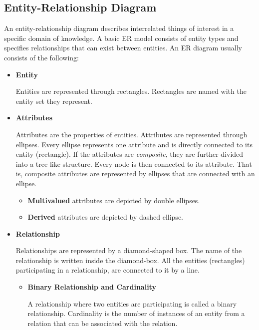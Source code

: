 	\subsection{Entity-Relationship Diagram}	
	\vs
	An entity-relationship diagram describes interrelated things of interest in a specific domain of knowledge. A basic ER model consists of entity types and specifies relationships that can exist between entities.
	\vs
	An ER diagram usually consists of the following:
	\begin{itemize}
	\item 
	\textbf{\large Entity}
	
	Entities are represented through rectangles. Rectangles are named with the entity set they represent. 
	\item 
	\textbf{\large Attributes}
	
	Attributes are the properties of entities. Attributes are represented through ellipses. Every ellipse represents one attribute and is directly connected to its entity (rectangle). If the attributes are {\em composite}, they are further divided into a tree-like structure. Every node is then connected to its attribute. That is, composite attributes are represented by ellipses that are connected with an ellipse. 
	\begin{itemize}
		\item \textbf{Multivalued} attributes are depicted by double ellipses.
		\item \textbf{Derived} attributes are depicted by dashed ellipse.
	\end{itemize}
	\item 
	\textbf{\large Relationship}
	
	Relationships are represented by a diamond-shaped box. The name of the relationship is written inside the diamond-box. All the entities (rectangles) participating in a relationship, are connected to it by a line. 
	\begin{itemize}
		\item \textbf{\large Binary Relationship and Cardinality}
		
		A relationship where two entities are participating is called a binary relationship. Cardinality is the number of instances of an entity from a relation that can be associated with the relation.
		

\end{itemize}
\end{itemize}
